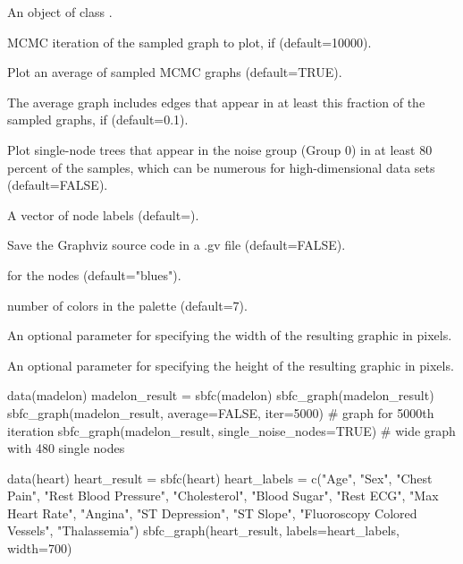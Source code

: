 \documentclass[a4paper]{book}
\begin{document}
\begin{Arguments}
\begin{ldescription}
\item[\code{sbfc\_result}] An object of class .

\item[\code{iter}] MCMC iteration of the sampled graph to plot, if  (default=10000).

\item[\code{average}] Plot an average of sampled MCMC graphs (default=TRUE).

\item[\code{edge\_cutoff}] The average graph includes edges that appear in at least this fraction of the sampled graphs, if  (default=0.1).

\item[\code{single\_noise\_nodes}] Plot single-node trees that appear in the noise group (Group 0) in at least 80 percent of the samples, which can be numerous for high-dimensional data sets (default=FALSE).

\item[\code{labels}] A vector of node labels (default=).

\item[\code{save\_graphviz\_code}] Save the Graphviz source code in a .gv file (default=FALSE).

\item[\code{colorscheme}]  for the nodes (default="blues").

\item[\code{ncolors}] number of colors in the palette (default=7).

\item[\code{width}] An optional parameter for specifying the width of the resulting graphic in pixels.

\item[\code{height}] An optional parameter for specifying the height of the resulting graphic in pixels.
\end{ldescription}
\end{Arguments}
%
\begin{Examples}
\begin{ExampleCode}
data(madelon)
madelon_result = sbfc(madelon)
sbfc_graph(madelon_result) 
sbfc_graph(madelon_result, average=FALSE, iter=5000) # graph for 5000th iteration
sbfc_graph(madelon_result, single_noise_nodes=TRUE) # wide graph with 480 single nodes

data(heart)
heart_result = sbfc(heart)
heart_labels = c("Age", "Sex", "Chest Pain", "Rest Blood Pressure", "Cholesterol", 
"Blood Sugar", "Rest ECG", "Max Heart Rate", "Angina", "ST Depression", "ST Slope",
"Fluoroscopy Colored Vessels", "Thalassemia")
sbfc_graph(heart_result, labels=heart_labels, width=700)
\end{ExampleCode}
\end{Examples}
\end{document}
